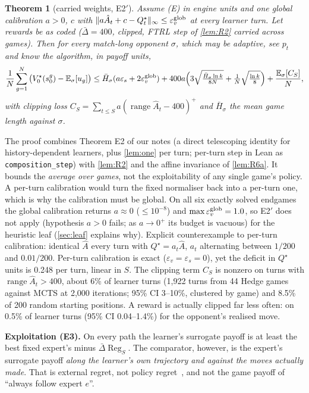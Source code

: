 \documentclass[10pt]{article}
\theoremstyle{plain}
\newtheorem{theorem}{Theorem}
\theoremstyle{definition}
\theoremstyle{remark}
\newcommand{\E}{\mathbb{E}}
\newcommand{\Hbar}{\bar H}
\newcommand{\epss}{\varepsilon_s}
\newcommand{\epsv}{\varepsilon_v}
\newcommand{\Ahat}{\hat A}
\newcommand{\Qstar}{Q^\star}
\newcommand{\Vstar}{V^\star}
\newcommand{\Dbar}{\bar\Delta}
\DeclareMathOperator{\Reg}{Reg}
\DeclareMathOperator{\range}{range}
\begin{document}
\begin{theorem}[carried weights, E2$'$]\label{thm:E2p}
Assume (E) in engine units and one \emph{global} calibration $a>0$, $c$ with $\lVert a\Ahat_t+c-\Qstar_t\rVert_\infty\le\epsv^{\rm glob}$ at every learner turn. Let rewards be as coded ($\Dbar=400$, clipped, FTRL step of \cref{lem:R2} carried across games). Then for every match-long opponent $\sigma$, which may be adaptive, see $p_t$ and know the algorithm, in payoff units,
\[
\frac1N\sum_{g=1}^N\big(\Vstar_0(s^g_0)-\E_\sigma[u_g]\big)\le\Hbar_\sigma(a\epss+2\epsv^{\rm glob})+400a\Big(3\sqrt{\tfrac{\Hbar_\sigma\ln k}{8N}}+\tfrac1N\sqrt{\tfrac{\ln k}8}\Big)+\frac{\E_\sigma[C_S]}N,
\]
with clipping loss $C_S=\sum_{t\le S}a(\range\Ahat_t-400)^+$ and $\Hbar_\sigma$ the mean game length against $\sigma$.
\end{theorem}
The proof combines Theorem E2 of our notes (a direct telescoping identity for history-dependent learners, plus \cref{lem:one} per turn; per-turn step in Lean as \texttt{composition\_step}) with \cref{lem:R2} and the affine invariance of \cref{lem:R6a}. It bounds the \emph{average over games}, not the exploitability of any single game's policy. A per-turn calibration would turn the fixed normaliser back into a per-turn one, which is why the calibration must be global. On all six exactly solved endgames the global calibration returns $a\approx0$ ($\le10^{-8}$) and $\max\epsv^{\rm glob}=1.0$, so E2$'$ does not apply (hypothesis $a>0$ fails; as $a\to0^+$ its budget is vacuous) for the heuristic leaf (\cref{sec:leaf} explains why). Explicit counterexample to per-turn calibration: identical $\Ahat$ every turn with $\Qstar=a_t\Ahat$, $a_t$ alternating between $1/200$ and $0.01/200$. Per-turn calibration is exact ($\epsv=\epss=0$), yet the deficit in $\Qstar$ units is 0.248 per turn, linear in $S$. The clipping term $C_S$ is nonzero on turns with $\range\Ahat_t>400$, about 6\% of learner turns (1,922 turns from 44 Hedge games against MCTS at 2,000 iterations; 95\% CI 3--10\%, clustered by game) and 8.5\% of 200 random starting positions. A reward is actually clipped far less often: on 0.5\% of learner turns (95\% CI 0.04--1.4\%) for the opponent's realised move.

\textbf{Exploitation (E3).} On every path the learner's surrogate payoff is at least the best fixed expert's minus $\Dbar\Reg_S$. The comparator, however, is the expert's surrogate payoff \emph{along the learner's own trajectory and against the moves actually made}. That is external regret, not policy regret~\cite{Aro12b}, and not the game payoff of ``always follow expert $e$''.
\end{document}
